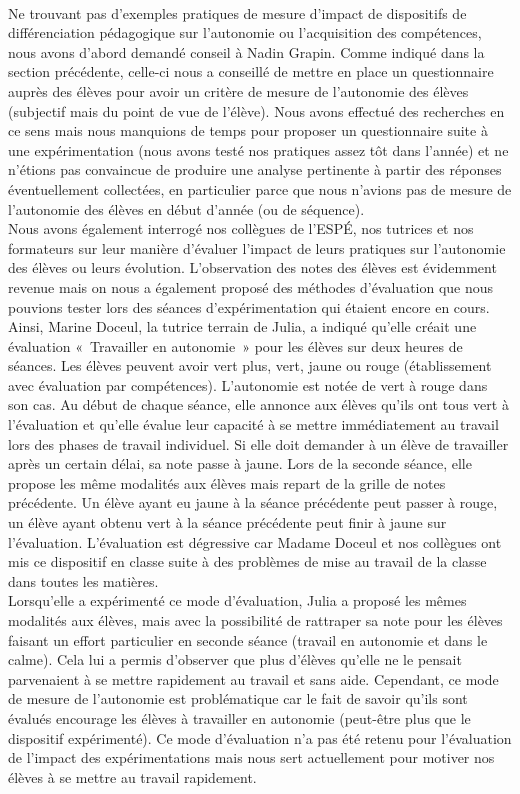 \paragraph*{} Ne trouvant pas d'exemples pratiques de mesure d'impact de dispositifs de différenciation pédagogique sur l'autonomie ou l'acquisition des compétences, nous avons d'abord demandé conseil à Nadin Grapin. Comme indiqué dans la section précédente, celle-ci nous a conseillé de mettre en place un questionnaire auprès des élèves pour avoir un critère de mesure  de l'autonomie des élèves (subjectif mais du point de vue de l'élève). Nous avons effectué des recherches en ce sens mais nous manquions de temps pour proposer un questionnaire suite à une expérimentation (nous avons testé nos pratiques assez tôt dans l'année) et ne n'étions pas convaincue de produire une analyse pertinente à partir des réponses éventuellement collectées, en particulier parce que nous n'avions pas de mesure de l'autonomie des élèves en début d'année (ou de séquence).\\
Nous avons également interrogé nos collègues de l'ESPÉ, nos tutrices et nos formateurs sur leur manière d'évaluer l'impact de leurs pratiques sur l'autonomie des élèves ou leurs évolution. L'observation des notes des élèves est évidemment revenue mais on nous a également proposé des méthodes d'évaluation que nous pouvions tester lors des séances d'expérimentation qui étaient encore en cours.
Ainsi, Marine Doceul, la tutrice terrain de Julia, a indiqué qu'elle créait une évaluation « Travailler en autonomie » pour les élèves sur deux heures de séances. Les élèves peuvent avoir vert plus, vert, jaune ou rouge (établissement avec évaluation par compétences). L'autonomie est notée de vert à rouge dans son cas. Au début de chaque séance, elle annonce aux élèves qu'ils ont tous vert à l'évaluation et qu'elle évalue leur capacité à se mettre immédiatement au travail lors des phases de travail individuel. Si elle doit demander à un élève de travailler après un certain délai, sa note passe à jaune. Lors de la seconde séance, elle propose les même modalités aux élèves mais repart de la grille de notes précédente. Un élève ayant eu jaune à la séance précédente peut passer à rouge, un élève ayant obtenu vert à la séance précédente peut finir à jaune sur l'évaluation. L'évaluation est dégressive car Madame Doceul et nos collègues ont mis ce dispositif en classe suite à des problèmes de mise au travail de la classe dans toutes les matières.\\
Lorsqu'elle a expérimenté ce mode d'évaluation, Julia a proposé les mêmes modalités aux élèves, mais avec la possibilité de rattraper sa note pour les élèves faisant un effort particulier en seconde séance (travail en autonomie et dans le calme). Cela lui a permis d'observer que plus d'élèves qu'elle ne le pensait parvenaient à se mettre rapidement au travail et sans aide. Cependant, ce mode de mesure de l'autonomie est problématique car le fait de savoir qu'ils sont évalués encourage les élèves à travailler en autonomie (peut-être plus que le dispositif expérimenté). Ce mode d'évaluation n'a pas été retenu pour l'évaluation de l'impact des expérimentations mais nous sert actuellement pour motiver nos élèves à se mettre au travail rapidement.\\
